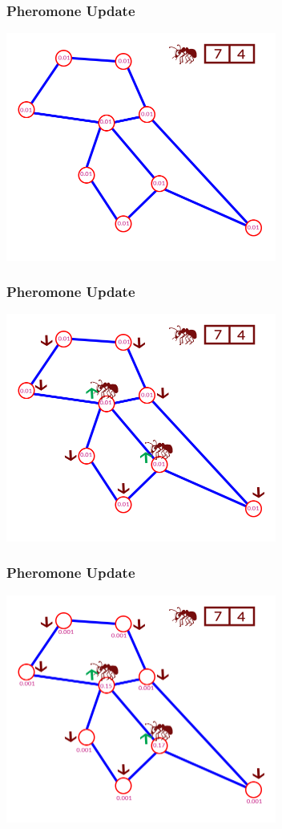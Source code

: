 \documentclass[12pt]{beamer}
\begin{document}
\begin{frame}
\frametitle{Pheromone Update}
\begin{center}
\includegraphics[height=75mm]{Images/increase1}\\
\end{center}
\end{frame}
\begin{frame}
\frametitle{Pheromone Update}
\begin{center}
\includegraphics[height=75mm]{Images/increase2}\\
\end{center}
\end{frame}
\begin{frame}
\frametitle{Pheromone Update}
\begin{center}
\includegraphics[height=75mm]{Images/increase3}\\
\end{center}
\end{frame}
\end{document}
